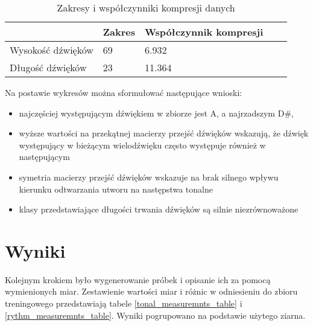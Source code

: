 {{        %
        \begin{table}
            \caption{Zakresy i\,\,współczynniki kompresji danych} \label{range_and_compression}
            \begin{center}
                \begin{tabular}{ |p{2.5cm}|p{2.5cm}|p{2.5cm}|p{2.5cm}|p{2.5cm}| }
                \hline
                 & Zakres & Współczynnik kompresji \\ 
                \hline
                Wysokość dźwięków & 69 & 6.932 \\  
                \hline
                Długość dźwięków & 23 & 11.364 \\
                \hline
                \end{tabular}
            \end{center}
        \end{table}

        \pagebreak

        Na postawie wykresów można sformułować następujące wnioski:
        \begin{itemize}
            \setlength\itemsep{-0.5em}
            \item najczęściej występującym dźwiękiem w\,\,zbiorze jest A, a\,\,najrzadszym D\#,
            \item wyższe wartości na przekątnej macierzy przejść dźwięków wskazują, że dźwięk występujący w\,\,bieżącym wielodźwięku
            często występuje również w\,\,następującym
            \item symetria macierzy przejść dźwięków wskazuje na brak silnego wpływu kierunku odtwarzania utworu na następstwa tonalne
            \item klasy przedstawiające długości trwania dźwięków są silnie niezrównoważone
        \end{itemize}
    }

    \section{Wyniki}
    {
        Kolejnym krokiem było wygenerowanie próbek i\,\,opisanie ich za pomocą wymienionych miar. Zestawienie wartości miar i\,\,różnic
        w\,\,odniesieniu do zbioru treningowego przedstawiają tabele \ref{tonal_measuremnts_table} i\,\,\ref{rythm_measuremnts_table}. Wyniki pogrupowano na podstawie użytego ziarna.

}}
